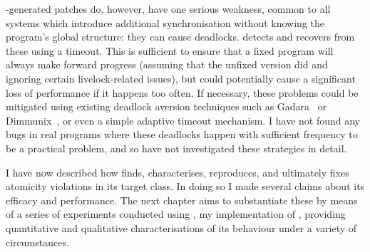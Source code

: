 {\Technique}-generated patches do, however, have one serious weakness,
common to all systems which introduce additional synchronisation
without knowing the program's global structure: they can cause
deadlocks.  {\Technique} detects and recovers from these using a
timeout.  This is sufficient to ensure that a fixed program will
always make forward progress (assuming that the unfixed version did
and ignoring certain livelock-related issues), but could potentially
cause a significant loss of performance if it happens too often.  If
necessary, these problems could be mitigated using existing deadlock
aversion techniques such as Gadara~\cite{FFFWang2008} or
Dimmunix~\cite{Jula2008}, or even a simple adaptive timeout mechanism.
I have not found any bugs in real programs where these deadlocks
happen with sufficient frequency to be a practical problem, and so
have not investigated these strategies in detail.

I have now described how {\technique} finds, characterises,
reproduces, and ultimately fixes atomicity violations in its target
class.  In doing so I made several claims about its efficacy and
performance.  The next chapter aims to substantiate these by means of
a series of experiments conducted using {\implementation}, my
implementation of {\technique}, providing quantitative and qualitative
characterisations of its behaviour under a variety of circumstances.

